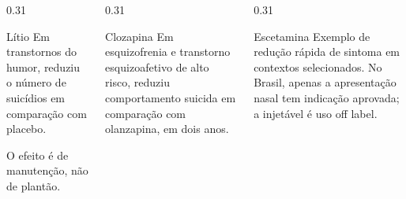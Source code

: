 \begin{frame}{}
\begin{columns}[onlytextwidth, t]
\begin{column}{0.31\textwidth}
\begin{caixafarmaco}{L\'itio}
Em transtornos do humor, reduziu o n\'umero de suic\'idios em compara\c{c}\~ao
com placebo.\par
{} O efeito \'e de manuten\c{c}\~ao, n\~ao de
plant\~ao.
\end{caixafarmaco}
\end{column}
\calha
\begin{column}{0.31\textwidth}
\begin{caixafarmaco}{Clozapina}
Em esquizofrenia e transtorno esquizoafetivo de alto risco, reduziu
comportamento suicida em compara\c{c}\~ao com olanzapina, em dois anos.
\end{caixafarmaco}
\end{column}
\calha
\begin{column}{0.31\textwidth}
\begin{caixafarmaco}{Escetamina}
Exemplo de redu\c{c}\~ao r\'apida de sintoma em contextos selecionados. No
Brasil, apenas a apresenta\c{c}\~ao nasal tem indica\c{c}\~ao aprovada; a
injet\'avel \'e uso off label.
\end{caixafarmaco}
\end{column}
\end{columns}

\CRvg
{}

\end{frame}

